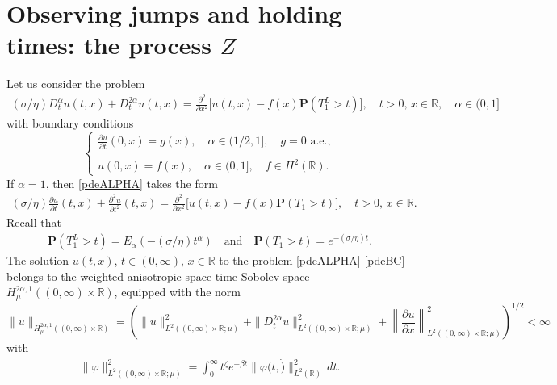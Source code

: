 \documentclass[10pt,a4paper]{article}
\numberwithin{equation}{section}
\theoremstyle{plain}
\theoremstyle{remark}
\begin{document}
\section{Observing jumps and holding times: the process $Z$}
\label{sec:Z}
Let us consider the problem
\begin{align}
(\sigma/\eta) D^\alpha_t u(t,x)  + D^{2\alpha}_t u(t,x) = \frac{\partial^2}{\partial x^2} \bigg[ u(t,x) - f(x) \mathbf{P}(T^L_1 > t) \bigg], \quad t>0,\, x \in \mathbb{R}, \quad \alpha \in (0,1]
\label{pdeALPHA}
\end{align}
with boundary conditions
\begin{equation}
\left\lbrace
\begin{array}{ll}
\displaystyle \frac{\partial u}{\partial t}(0, x)=g(x), \quad \alpha \in (1/2, 1], \quad g=0 \textrm{ a.e.}, \\
\\
\displaystyle u(0,x)=f(x), \quad \alpha \in (0,1], \quad f \in H^2(\mathbb{R}). 
\end{array}
\right.
\label{pdeBC}
\end{equation}
If $\alpha=1$, then \eqref{pdeALPHA} takes the form
\begin{align}
(\sigma/\eta) \frac{\partial u}{\partial t}(t,x)  + \frac{\partial^2 u}{\partial t^2}(t,x) = \frac{\partial^2}{\partial x^2} \bigg[ u(t,x) - f(x) \mathbf{P}(T_1 > t) \bigg], \quad t>0,\, x \in \mathbb{R}.
\label{pdeUNO}
\end{align}
Recall that 
\begin{align*}
\mathbf{P}(T^L_1> t) = E_\alpha(-(\sigma/\eta) t^\alpha)\quad \textrm{and}  \quad \mathbf{P}(T_1 > t) = e^{-(\sigma/\eta) t}.
\end{align*}
The solution $u(t,x)$, $t \in (0, \infty)$, $x \in \mathbb{R}$ to the problem \eqref{pdeALPHA}-\eqref{pdeBC} belongs to the weighted anisotropic space-time Sobolev space $H^{2\alpha, 1}_\mu((0, \infty) \times \mathbb{R})$, equipped with the norm
\begin{equation}
\|u\|_{H^{2\alpha, 1}_\mu((0, \infty) \times \mathbb{R})} = \left( \|u\|^2_{L^2((0, \infty) \times \mathbb{R}; \mu)} + \|D^{2\alpha}_t u\|^2_{L^2((0, \infty) \times \mathbb{R}; \mu)} + \left\|\frac{\partial u}{\partial x}\right\|^2_{L^2((0, \infty) \times \mathbb{R}; \mu)} \right)^{1/2} < \infty
\end{equation}
with 
\begin{align*}
\| \varphi \|^2_{L^2((0, \infty)\times \mathbb{R}; \mu)} = \int_0^\infty   t^\zeta e^{-\beta t} \| \varphi(t, \dot) \|^2_{L^2(\mathbb{R})} \, dt.
\end{align*}
\end{document}
